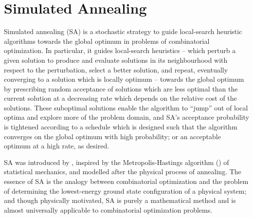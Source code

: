 \section{Simulated Annealing}
Simulated annealing (SA) is a stochastic strategy to guide local-search heuristic algorithms towards the global optimum in problems of combinatorial optimization. In particular, it guides local-search heuristics -- which perturb a given solution to produce and evaluate solutions in its neighbourhood with respect to the perturbation, select a better solution, and repeat, eventually converging to a solution which is locally optimum -- towards the global optimum by prescribing random acceptance of solutions which are less optimal than the current solution at a decreasing rate which depends on the relative cost of the solutions. These suboptimal solutions enable the algorithm to ``jump'' out of local optima and explore more of the problem domain, and SA's acceptance probability is tightened according to a schedule which is designed such that the algorithm converges on the global optimum with high probability; or an acceptable optimum at a high rate, as desired.

SA was introduced by \textcite{Kirkpatrick671}, inspired by the Metropolis-Hastings algorithm (\cite{metro53}) of statistical mechanics, and modelled after the physical process of annealing. The essence of SA is the analogy between combinatorial optimization and the problem of determining the lowest-energy ground state configuration of a physical system; and though physically motivated, SA is purely a mathematical method and is almost universally applicable to combinatorial optimization problems.

